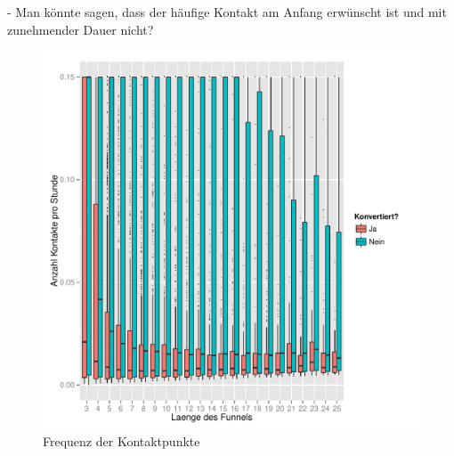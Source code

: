 - Man könnte sagen, dass der häufige Kontakt am Anfang erwünscht ist und mit zunehmender Dauer nicht?
    \begin{figure}[H]
        \centering
    \includegraphics[scale=0.5]{freq.pdf}
    \caption{Frequenz der Kontaktpunkte}
    \label{Fig_10}
    \end{figure}
    













































